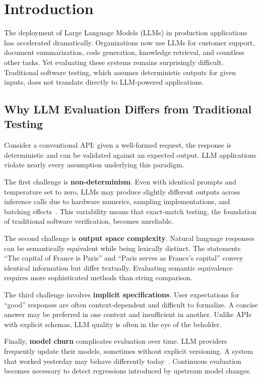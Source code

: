 
\section{Introduction}
\label{sec:introduction}

The deployment of Large Language Models (LLMs) in production applications has accelerated dramatically. Organizations now use LLMs for customer support, document summarization, code generation, knowledge retrieval, and countless other tasks. Yet evaluating these systems remains surprisingly difficult. Traditional software testing, which assumes deterministic outputs for given inputs, does not translate directly to LLM-powered applications.

\subsection{Why LLM Evaluation Differs from Traditional Testing}

Consider a conventional API: given a well-formed request, the response is deterministic and can be validated against an expected output. LLM applications violate nearly every assumption underlying this paradigm.

The first challenge is \textbf{non-determinism}. Even with identical prompts and temperature set to zero, LLMs may produce slightly different outputs across inference calls due to hardware numerics, sampling implementations, and batching effects~\citep{ouyang2022training}. This variability means that exact-match testing, the foundation of traditional software verification, becomes unreliable.

The second challenge is \textbf{output space complexity}. Natural language responses can be semantically equivalent while being lexically distinct. The statements ``The capital of France is Paris'' and ``Paris serves as France's capital'' convey identical information but differ textually. Evaluating semantic equivalence requires more sophisticated methods than string comparison.

The third challenge involves \textbf{implicit specifications}. User expectations for ``good'' responses are often context-dependent and difficult to formalize. A concise answer may be preferred in one context and insufficient in another. Unlike APIs with explicit schemas, LLM quality is often in the eye of the beholder.

Finally, \textbf{model churn} complicates evaluation over time. LLM providers frequently update their models, sometimes without explicit versioning. A system that worked yesterday may behave differently today~\citep{sainz2023nlp}. Continuous evaluation becomes necessary to detect regressions introduced by upstream model changes.


